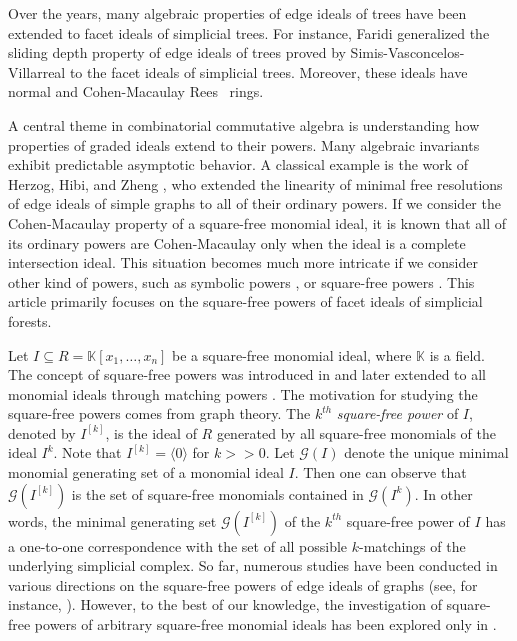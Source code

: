 \documentclass[12pt,a4paper,reqno]{amsart}
\theoremstyle{definition}
\def\K{\mathbb{K}}
\def\l{\langle}
\def\r{\rangle}
\begin{document}
Over the years, many algebraic properties of edge ideals of trees have been extended to facet ideals of simplicial trees. For instance, Faridi \cite{Faridi2002} generalized the sliding depth property of edge ideals of trees proved by Simis-Vasconcelos-Villarreal \cite{SVV1994} to the facet ideals of simplicial trees. Moreover, these ideals have normal and Cohen-Macaulay Rees~ rings.

A central theme in combinatorial commutative algebra is understanding how properties of graded ideals extend to their powers. Many algebraic invariants exhibit predictable asymptotic behavior. A classical example is the work of Herzog, Hibi, and Zheng \cite{HHZ04}, who extended the linearity of minimal free resolutions of edge ideals of simple graphs to all of their ordinary powers. If we consider the Cohen-Macaulay property of a square-free monomial ideal, it is known that all of its ordinary powers are Cohen-Macaulay only when the ideal is a complete intersection ideal. This situation becomes much more intricate if we consider other kind of powers, such as symbolic powers \cite{RTY11}, or square-free powers \cite{MF2024}. This article primarily focuses on the square-free powers of facet ideals of simplicial forests.

Let $I\subseteq R=\K[x_1,\ldots , x_n]$ be a square-free monomial ideal, where $\K$ is a field.
The concept of square-free powers was introduced in \cite{BHZN} and later extended to all monomial ideals through matching powers \cite{ErFi1}. The motivation for studying the square-free powers comes from graph theory. The $k^{th}$ \textit{square-free power} of $I$, denoted by $I^{[k]}$, is the ideal of $R$ generated by all square-free monomials of the ideal $I^k$. Note that $I^{[k]}=\l 0\r$ for $k>>0$. Let $\mathcal{G}(I)$ denote the unique minimal monomial generating set of a monomial ideal $I$. Then one can observe that $\mathcal{G}(I^{[k]})$ is the set of square-free monomials contained in $\mathcal{G}(I^k)$. In other words, the minimal generating set $\mathcal{G}(I^{[k]})$ of the $k^{th}$ square-free power of $I$ has a one-to-one correspondence with the set of all possible $k$-matchings of the underlying simplicial complex. So far, numerous studies have been conducted in various directions on the square-free powers of edge ideals of graphs (see, for instance, \cite{CFL1,DRS12024,EHHS,EHHM12,ErHi1,FiHeHi,MF2024,SaS1}). However, to the best of our knowledge, the investigation of square-free powers of arbitrary square-free monomial ideals has been explored only in \cite{kamberi2024squarefreepowerssimplicialtrees}.
\end{document}
